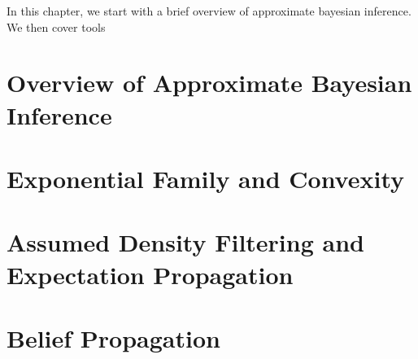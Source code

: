 
In this chapter, we start with a brief overview of approximate bayesian inference. We then cover tools  

\section{Overview of Approximate Bayesian Inference}



\section{\label{point:expof-convex}Exponential Family and Convexity}





\section{\label{s:ADF+EP}Assumed Density Filtering and Expectation Propagation}


\section{\label{bg:belief-propag}Belief Propagation}



